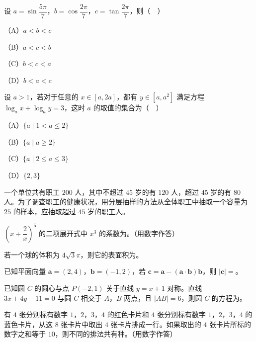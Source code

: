 \begin{question}
设 $a=\sin\dfrac{5\pi}7$，$b=\cos\dfrac{2\pi}7$，$c=\tan\dfrac{2\pi}7$，则（　）

（A）$a<b<c$

（B）$a<c<b$

（C）$b<c<a$

（D）$b<a<c$

\end{question}
\begin{question}
设 $a>1$，若对于任意的 $x\in[a,2a]$，都有 $y\in[a,a^2]$ 满足方程 $\log_ax+\log_ay=3$，这时 $a$ 的取值的集合为（　）

（A）$\{a\mid1<a\leqslant2\}$

（B）$\{a\mid a\geqslant2\}$

（C）$\{a\mid2\leqslant a\leqslant3\}$

（D）$\{2,3\}$

\end{question}

\begin{question}
一个单位共有职工 $200$ 人，其中不超过 $45$ 岁的有 $120$ 人，超过 $45$ 岁的有 $80$ 人。为了调查职工的健康状况，用分层抽样的方法从全体职工中抽取一个容量为 $25$ 的样本，应抽取超过 $45$ 岁的职工\gkblank{}人。

\end{question}
\begin{question}
$\left(x+\dfrac2x\right)^5$ 的二项展开式中 $x^3$ 的系数为\gkblank{}。（用数字作答）

\end{question}
\begin{question}
若一个球的体积为 $4\sqrt3\pi$，则它的表面积为\gkblank{}。

\end{question}
\begin{question}
已知平面向量 $\boldsymbol a=(2,4)$，$\boldsymbol b=(-1,2)$，若 $\boldsymbol c=\boldsymbol a-(\boldsymbol a\cdot\boldsymbol b)\boldsymbol b$，则 $|\boldsymbol c|=$\gkblank{}。

\end{question}
\begin{question}
已知圆 $C$ 的圆心与点 $P(-2,1)$ 关于直线 $y=x+1$ 对称。直线 $3x+4y-11=0$ 与圆 $C$ 相交于 $A$，$B$ 两点，且 $|AB|=6$，则圆 $C$ 的方程为\gkblank{}。

\end{question}
\begin{question}
有 $4$ 张分别标有数字 $1$，$2$，$3$，$4$ 的红色卡片和 $4$ 张分别标有数字 $1$，$2$，$3$，$4$ 的蓝色卡片，从这 $8$ 张卡片中取出 $4$ 张卡片排成一行。如果取出的 $4$ 张卡片所标的数字之和等于 $10$，则不同的排法共有\gkblank{}种。（用数字作答）

\end{question}

